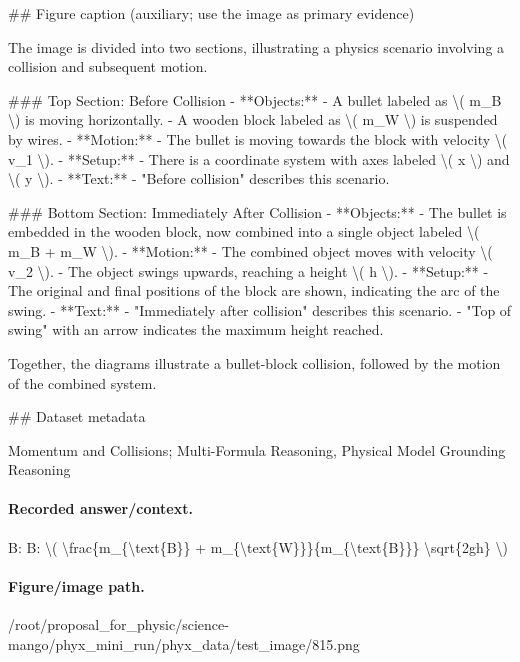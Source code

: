 \#\# Figure caption (auxiliary; use the image as primary evidence)

The image is divided into two sections, illustrating a physics scenario involving a collision and subsequent motion.

\#\#\# Top Section: Before Collision
- **Objects:**
  - A bullet labeled as \textbackslash{}( m\_B \textbackslash{}) is moving horizontally.
  - A wooden block labeled as \textbackslash{}( m\_W \textbackslash{}) is suspended by wires.
- **Motion:**
  - The bullet is moving towards the block with velocity \textbackslash{}( v\_1 \textbackslash{}).
- **Setup:**
  - There is a coordinate system with axes labeled \textbackslash{}( x \textbackslash{}) and \textbackslash{}( y \textbackslash{}).
- **Text:**
  - "Before collision" describes this scenario.

\#\#\# Bottom Section: Immediately After Collision
- **Objects:**
  - The bullet is embedded in the wooden block, now combined into a single object labeled \textbackslash{}( m\_B + m\_W \textbackslash{}).
- **Motion:**
  - The combined object moves with velocity \textbackslash{}( v\_2 \textbackslash{}).
  - The object swings upwards, reaching a height \textbackslash{}( h \textbackslash{}).
- **Setup:**
  - The original and final positions of the block are shown, indicating the arc of the swing.
- **Text:**
  - "Immediately after collision" describes this scenario.
  - "Top of swing" with an arrow indicates the maximum height reached.
  
Together, the diagrams illustrate a bullet-block collision, followed by the motion of the combined system.

\#\# Dataset metadata

Momentum and Collisions; Multi-Formula Reasoning, Physical Model Grounding Reasoning

\paragraph{Recorded answer/context.}
B: B: \textbackslash{}( \textbackslash{}frac\{m\_\{\textbackslash{}text\{B\}\} + m\_\{\textbackslash{}text\{W\}\}\}\{m\_\{\textbackslash{}text\{B\}\}\} \textbackslash{}sqrt\{2gh\} \textbackslash{})

\paragraph{Figure/image path.}
/root/proposal\_for\_physic/science-mango/phyx\_mini\_run/phyx\_data/test\_image/815.png

